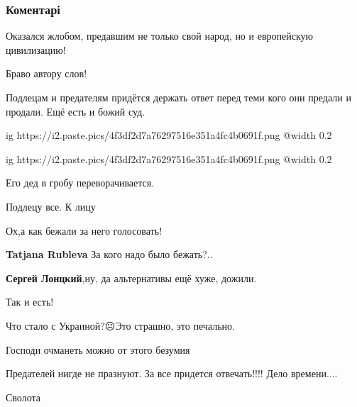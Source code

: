  
 
 
 
 
\subsubsection{Коментарі}

\begin{itemize} %
Оказался жлобом, предавшим не только свой народ, но и европейскую цивилизацию!

Браво автору слов!

Подлецам и предателям придётся держать ответ перед теми кого они предали и продали. Ещё есть и божий суд.


\ifcmt
  ig https://i2.paste.pics/4f3df2d7a76297516e351a4fc4b0691f.png
  @width 0.2
\fi


\ifcmt
  ig https://i2.paste.pics/4f3df2d7a76297516e351a4fc4b0691f.png
  @width 0.2
\fi

Его дед в гробу переворачивается.

Подлецу все. К лицу

Ох,а как бежали за него голосовать!

\begin{itemize} %
\textbf{Tatjana Rubleva} За кого надо было бежать?..

\textbf{Сергей Лонцкий},ну, да альтернативы ещё хуже, дожили.
\end{itemize} %

Так и есть!

Что стало с Украиной?☹️Это страшно, это печально.

Господи очманеть можно от этого безумия

Предателей нигде не празнуют. За все придется отвечать!!!! Дело времени....

Сволота


\end{itemize}
